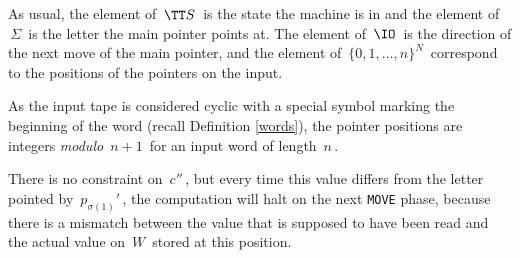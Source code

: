 
As usual, the element of $\,\TT S\,$ is the state the machine is in and the element of $\,\Sigma\,$ is the letter the main pointer points at.
The element of $\,\IO\,$ is the direction of the next move of the main pointer, and the element of $\,\{0,1,\dots,n\}^N\,$ correspond to the positions of the pointers on the input.

\smallskip

As the input tape is considered cyclic with a special symbol marking the beginning of the word (recall Definition \ref{words}), the pointer positions are integers \emph{modulo} $\,n+1\,$ for an input word of length $\,n\,$.

There is no constraint on $\,c''\,$, but every time this value differs from the letter pointed by $\,p_{\sigma(1)}'\,$, the computation will halt on the next \texttt{MOVE} phase, because there is a mismatch between the value that is supposed to have been read and the actual value on $\,W\,$ stored at this position.


